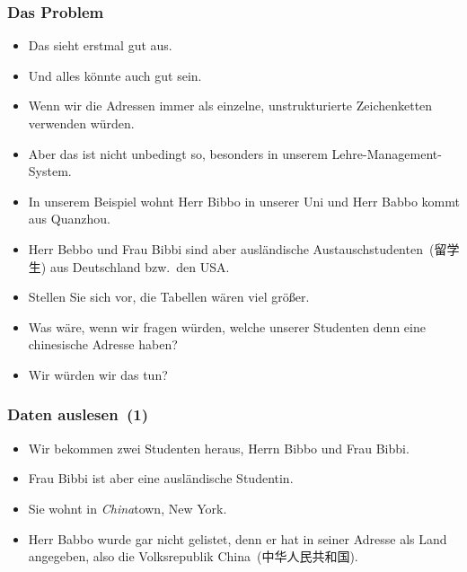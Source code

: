 \documentclass[aspectratio=169,mathserif,notheorems]{beamer}%
\begin{document}
%
\begin{frame}%
\frametitle{Das Problem}%
\begin{itemize}%
\item Das sieht erstmal gut aus.%
%
\item<2-> Und alles könnte auch gut sein.%
%
\item<3-> Wenn wir die Adressen immer als einzelne, unstrukturierte Zeichenketten verwenden würden.%
%
\item<4-> Aber das ist nicht unbedingt so, besonders in unserem Lehre-Management-System.%
%
\item<5-> In unserem Beispiel wohnt Herr Bibbo in unserer Uni und Herr Babbo kommt aus Quanzhou.%
%
\item<6-> Herr Bebbo und Frau Bibbi sind aber ausländische Austauschstudenten~(留学生) aus Deutschland bzw.\ den USA.%
%
\item<7-> Stellen Sie sich vor, die Tabellen wären viel größer.%
%
\item<8-> Was wäre, wenn wir fragen würden, welche unserer Studenten denn eine chinesische Adresse haben?%
%
\item<9-> Wir würden wir das tun?%
\end{itemize}%
\end{frame}%
%
\begin{frame}[t]%
\frametitle{Daten auslesen~(1)}%
\parbox{0.435\linewidth}{\small%
\begin{itemize}%
%
%
%
%
%
%
%
%
%
%
%
\item<6-> Wir bekommen zwei Studenten heraus, Herrn Bibbo und Frau Bibbi.%
%
\item<7-> Frau Bibbi ist aber eine ausländische Studentin.%
%
\item<8-> Sie wohnt in \emph{China}town, New York.%
%
\item<9-> Herr Babbo wurde gar nicht gelistet, denn er hat in seiner Adresse  als Land angegeben, also die Volksrepublik China~(中华人民共和国).%
%
\end{itemize}%
}%
%
\end{frame}%
\end{document}
